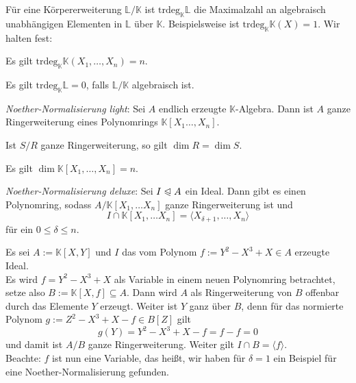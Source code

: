 \documentclass[11pt]{book}
\theoremstyle{nonumberbreak}
\newenvironment{ex}[1][]{\ifthenelse{\equal{#1}{}}{\example}{\example[#1]}\rm}{\endexample}
\newenvironment{erinnbem}[1][]{\ifthenelse{\equal{#1}{}}{\erinnerbem}{\erinnerbem[#1]}\rm}{\enderinnerbem}
\begin{document}
\begin{spacing}{1.3}
\begin{erinnbem} %

Für eine Körpererweiterung $\mathbb{L}/\mathbb{K}$ ist 
$\textrm{trdeg}_{\mathbb{K}} \mathbb{L}$
die Maximalzahl an algebraisch unabhängigen Elementen in $\mathbb{L}$ über $\mathbb{K}$. Beispielsweise ist $\textrm{trdeg}_{\mathbb{K}} \mathbb{K}(X)=1$. Wir halten fest:
\begin{compactenum}
\item Es gilt $\textrm{trdeg}_{\mathbb{K}} \mathbb{K}(X_1, \ldots, X_n) = n$.
\item Es gilt $\textrm{trdeg}_{\mathbb{K}} \mathbb{L}=0$, falls $\mathbb{L}/\mathbb{K}$ algebraisch ist.
\item \textit{Noether-Normalisierung light}: Sei $A$ endlich erzeugte $\mathbb{K}$-Algebra. Dann ist $A$ ganze Ringerweiterung eines Polynomrings $\mathbb{K}[X_1 \ldots, X_n]$.
\item Ist $S/R$ ganze Ringerweiterung, so gilt $\dim R = \dim S$.
\item Es gilt $\dim \mathbb{K}[X_1, \ldots, X_n]=n$.
\item \textit{Noether-Normalisierung deluxe}:
Sei $I \trianglelefteqslant A$ ein Ideal. Dann gibt es einen Polynomring, sodass $A / \mathbb{K}[X_1, \ldots X_n]$ ganze Ringerweiterung ist und 
$$I \cap \mathbb{K}[X_1, \ldots X_n] = \langle X_{\delta + 1}, \ldots, X_{n} \rangle$$
für ein $0 \leqslant \delta \leqslant n$.
\end{compactenum}
\end{erinnbem}

\begin{ex}

Es sei $A:= \mathbb{K}[X,Y]$ und $I$ das vom Polynom $f:=Y^2-X^3+X \in A$ erzeugte Ideal.\\
Es wird $f= Y^2-X^3+X$ als Variable in einem neuen Polynomring betrachtet, setze also $B:= \mathbb{K}[X,f] \subseteq A$. Dann wird $A$ als Ringerweiterung von $B$ offenbar durch das Elemente $Y$ erzeugt. Weiter ist $Y$ ganz über $B$, denn für das normierte Polynom $g:= Z^2-X^3+X-f \in B[Z]$ gilt
$$g(Y)= Y^2-X^3+X-f = f-f = 0$$
und damit ist $A/B$ ganze Ringerweiterung. Weiter gilt $I \cap B = \langle f \rangle$.\\Beachte: $f$ ist nun eine Variable, das heißt, wir haben für $\delta = 1$ ein Beispiel für eine Noether-Normalisierung gefunden.
\end{ex}


\end{spacing}
\end{document}
